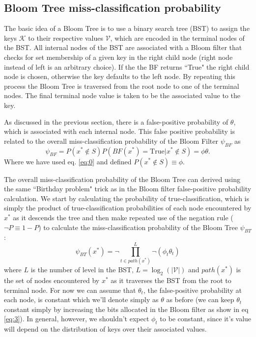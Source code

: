 \documentclass[12pt]{article}
\begin{document}
\subsection*{Bloom Tree miss-classification probability}

The basic idea of a Bloom Tree is to use a binary search tree (BST) to assign the keys $\mathcal{K}$ to their respective values $\mathcal{V}$, which are encoded in the terminal nodes of the BST. All internal nodes of the BST are associated with a Bloom filter that checks for set membership of a given key in the right child node (right node instead of left is an arbitrary choice). If the the BF returns ``True" the right child node is chosen, otherwise the key defaults to the left node. By repeating this process the Bloom Tree is traversed from the root node to one of the terminal nodes. The final terminal node value is taken to be the associated value to the key. 

As discussed in the previous section, there is a false-positive probability of $\theta$, which is associated with each internal node. This false positive probability is related to the overall miss-classification probability of the Bloom Filter $\psi_{BF}$ as
\begin{equation}
\psi_{BF}  = P(x^* \notin S)P(BF(x^*) = \mathrm{True} | x^* \notin S) = \phi \theta. 
\end{equation}
Where we have used eq. \ref{eq:0} and defined $P(x^* \notin S) \equiv \phi$. 


The overall miss-classification probability of the Bloom Tree can derived using the same ``Birthday problem" trick as in the Bloom filter false-positive probability calculation. We start by calculating the probability of true-classification, which is simply the product of true-classification probabilities of each node encountered by $x^*$ as it descends the tree and then make repeated use of the negation rule ($\lnot P \equiv 1 - P$) to calculate the miss-classification probability of the Bloom Tree $\psi_{BT}$:
\begin{equation} \label{eq:7}
\psi_{BT}(x^*) = \lnot \prod_{t \in path(x^*)}^L \lnot (\phi_t \theta_t)  
\end{equation}
where $L$ is the number of level in the BST, $L = \log_2(|\mathcal{V}|)$ and $path(x^*)$ is the set of nodes encountered by $x^*$ as it traverses the BST from the root to terminal node. For now we can assume that $\theta_t$, the false-positive probability at each node, is constant which we'll denote simply as $\theta$ as before (we can keep $\theta_t$ constant simply by increasing the bits allocated in the Bloom filter as show in eq \ref{eq:3}). In general, however, we shouldn't expect  $\phi_t$ to be constant, since it's value will depend on the distribution of keys over their associated values. 
\end{document}
